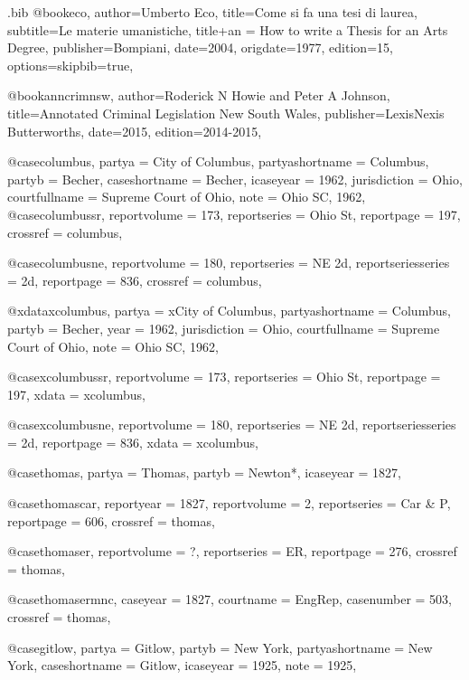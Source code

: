 \begin{filecontents*}{\jobname.bib}
@book{eco,
author={Umberto Eco},
title={Come si fa una tesi di laurea},
subtitle={Le materie umanistiche},
title+an = {How to write a Thesis for an Arts Degree},
publisher={Bompiani},
date={2004},
origdate={1977},
edition={15},
options={skipbib=true},
}

@book{anncrimnsw,
author={Roderick N Howie and Peter A Johnson},
title={Annotated Criminal Legislation New South Wales},
publisher={LexisNexis Butterworths},
date={2015},
edition={2014-2015},
}

@case{columbus,
  partya = {City of Columbus},
  partyashortname = {Columbus}, 
  partyb = {Becher},
  caseshortname = {Becher},
  icaseyear = {1962},
  jurisdiction = {Ohio},
  courtfullname = {Supreme Court of Ohio},
  note = {Ohio SC, 1962},
	}
@case{columbussr,
  reportvolume = {173},
  reportseries = {Ohio St},
  reportpage = {197},
  crossref = {columbus},
}

@case{columbusne,
  reportvolume = {180},
  reportseries = {NE 2d},
  reportseriesseries = {2d},
  reportpage = {836},
  crossref = {columbus},
}

@xdata{xcolumbus,
  partya = {xCity of Columbus},
  partyashortname = {Columbus}, 
  partyb = {Becher},
  year = {1962},
  jurisdiction = {Ohio},
  courtfullname = {Supreme Court of Ohio},
  note = {Ohio SC, 1962},
	}
	
@case{xcolumbussr,
  reportvolume = {173},
  reportseries = {Ohio St},
  reportpage = {197},
  xdata = {xcolumbus},
}

@case{xcolumbusne,
  reportvolume = {180},
  reportseries = {NE 2d},
  reportseriesseries = {2d},
  reportpage = {836},
  xdata = {xcolumbus},
}


@case{thomas,
  partya = {Thomas},
  partyb = {Newton*},
  icaseyear = {1827},
	}

@case{thomascar,
  reportyear = {1827},
  reportvolume = {2},
  reportseries = {Car \& P},
  reportpage = {606},
  crossref = {thomas},
}

@case{thomaser,
  reportvolume = {?},
  reportseries = {ER},
  reportpage = {276},
  crossref = {thomas},
}

@case{thomasermnc,
  caseyear = {1827},
  courtname = {EngRep},
  casenumber = {503},
  crossref = {thomas},
}


@case{gitlow,
  partya = {Gitlow},
  partyb = {New York},%
  partyashortname = {New York}, 
  caseshortname = {Gitlow},
  icaseyear = {1925},
  note = {1925},
	}



\end{filecontents*}
